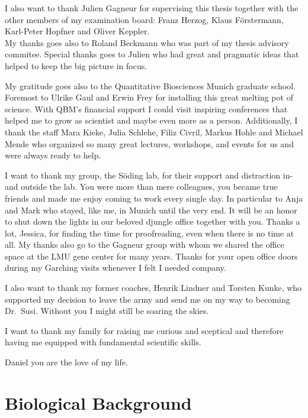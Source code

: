 \documentclass[11pt,a4paper,twoside]{book}
\theoremstyle{definition}
\theoremstyle{definition}
\theoremstyle{remark}
\begin{document}
I also want to thank Julien Gagneur for supervising this thesis together
with the other members of my examination board: Franz Herzog, Klaus
Förstermann, Karl-Peter Hopfner and Oliver Keppler.\\
My thanks goes also to Roland Beckmann who was part of my thesis
advisory commitee. Special thanks goes to Julien who had great and
pragmatic ideas that helped to keep the big picture in focus.

My gratitude goes also to the Quantitative Biosciences Munich graduate
school. Foremost to Ulrike Gaul and Erwin Frey for installing this great
melting pot of science. With QBM's financial support I could visit
inspiring conferences that helped me to grow as scientist and maybe even
more as a person. Additionally, I thank the staff Mara Kieke, Julia
Schlehe, Filiz Civril, Markus Hohle and Michael Mende who organized so
many great lectures, workshops, and events for us and were always ready
to help.

I want to thank my group, the Söding lab, for their support and
distraction in- and outside the lab. You were more than mere colleagues,
you became true friends and made me enjoy coming to work every single
day. In particular to Anja and Mark who stayed, like me, in Munich until
the very end. It will be an honor to shut down the lights in our beloved
djungle office together with you. Thanks a lot, Jessica, for finding the
time for proofreading, even when there is no time at all. My thanks also
go to the Gagneur group with whom we shared the office space at the LMU
gene center for many years. Thanks for your open office doors during my
Garching visits whenever I felt I needed company.

I also want to thank my former coaches, Henrik Lindner and Torsten
Kunke, who supported my decision to leave the army and send me on my way
to becoming Dr.~Susi. Without you I might still be soaring the skies.

I want to thank my family for raising me curious and sceptical and
therefore having me equipped with fundamental scientific skills.

Daniel you are the love of my life.

\tableofcontents
{}

\mainmatter \setcounter{page}{1}

\chapter{Biological Background}\label{general-intro}
\end{document}
